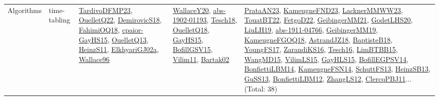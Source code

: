 {\begin{longtable}{lp{3cm}>{\raggedright}p{6cm}>{\raggedright}p{6cm}p{8cm}}
Algorithms & time-tabling & \href{papers/TardivoDFMP23.pdf}{TardivoDFMP23}\cite{TardivoDFMP23}, \href{papers/OuelletQ22.pdf}{OuelletQ22}\cite{OuelletQ22}, \href{papers/DemirovicS18.pdf}{DemirovicS18}\cite{DemirovicS18}, \href{articles/FahimiOQ18.pdf}{FahimiOQ18}\cite{FahimiOQ18}, \href{papers/cpaior-GayHS15.pdf}{cpaior-GayHS15}\cite{cpaior-GayHS15}, \href{papers/OuelletQ13.pdf}{OuelletQ13}\cite{OuelletQ13}, \href{papers/HeinzS11.pdf}{HeinzS11}\cite{HeinzS11}, \href{papers/ElkhyariGJ02a.pdf}{ElkhyariGJ02a}\cite{ElkhyariGJ02a}, \href{articles/Wallace96.pdf}{Wallace96}\cite{Wallace96} & \href{articles/WallaceY20.pdf}{WallaceY20}\cite{WallaceY20}, \href{articles/abs-1902-01193.pdf}{abs-1902-01193}\cite{abs-1902-01193}, \href{papers/Tesch18.pdf}{Tesch18}\cite{Tesch18}, \href{papers/OuelletQ18.pdf}{OuelletQ18}\cite{OuelletQ18}, \href{papers/GayHS15.pdf}{GayHS15}\cite{GayHS15}, \href{papers/BofillGSV15.pdf}{BofillGSV15}\cite{BofillGSV15}, \href{papers/Vilim11.pdf}{Vilim11}\cite{Vilim11}, \href{papers/Bartak02.pdf}{Bartak02}\cite{Bartak02} & \href{articles/PrataAN23.pdf}{PrataAN23}\cite{PrataAN23}, \href{papers/KameugneFND23.pdf}{KameugneFND23}\cite{KameugneFND23}, \href{articles/LacknerMMWW23.pdf}{LacknerMMWW23}\cite{LacknerMMWW23}, \href{papers/TouatBT22.pdf}{TouatBT22}\cite{TouatBT22}, \href{articles/FetgoD22.pdf}{FetgoD22}\cite{FetgoD22}, \href{papers/GeibingerMM21.pdf}{GeibingerMM21}\cite{GeibingerMM21}, \href{papers/GodetLHS20.pdf}{GodetLHS20}\cite{GodetLHS20}, \href{papers/LiuLH19.pdf}{LiuLH19}\cite{LiuLH19}, \href{articles/abs-1911-04766.pdf}{abs-1911-04766}\cite{abs-1911-04766}, \href{papers/GeibingerMM19.pdf}{GeibingerMM19}\cite{GeibingerMM19}, \href{papers/KameugneFGOQ18.pdf}{KameugneFGOQ18}\cite{KameugneFGOQ18}, \href{papers/AstrandJZ18.pdf}{AstrandJZ18}\cite{AstrandJZ18}, \href{articles/BaptisteB18.pdf}{BaptisteB18}\cite{BaptisteB18}, \href{papers/YoungFS17.pdf}{YoungFS17}\cite{YoungFS17}, \href{articles/ZarandiKS16.pdf}{ZarandiKS16}\cite{ZarandiKS16}, \href{papers/Tesch16.pdf}{Tesch16}\cite{Tesch16}, \href{papers/LimBTBB15.pdf}{LimBTBB15}\cite{LimBTBB15}, \href{articles/WangMD15.pdf}{WangMD15}\cite{WangMD15}, \href{papers/VilimLS15.pdf}{VilimLS15}\cite{VilimLS15}, \href{papers/GayHLS15.pdf}{GayHLS15}\cite{GayHLS15}, \href{papers/BofillEGPSV14.pdf}{BofillEGPSV14}\cite{BofillEGPSV14}, \href{articles/BonfiettiLBM14.pdf}{BonfiettiLBM14}\cite{BonfiettiLBM14}, \href{articles/KameugneFSN14.pdf}{KameugneFSN14}\cite{KameugneFSN14}, \href{papers/SchuttFS13.pdf}{SchuttFS13}\cite{SchuttFS13}, \href{articles/HeinzSB13.pdf}{HeinzSB13}\cite{HeinzSB13}, \href{papers/GuSS13.pdf}{GuSS13}\cite{GuSS13}, \href{papers/BonfiettiLBM12.pdf}{BonfiettiLBM12}\cite{BonfiettiLBM12}, \href{papers/ZhangLS12.pdf}{ZhangLS12}\cite{ZhangLS12}, \href{papers/ClercqPBJ11.pdf}{ClercqPBJ11}\cite{ClercqPBJ11}... (Total: 38)\\
\end{longtable}
}

